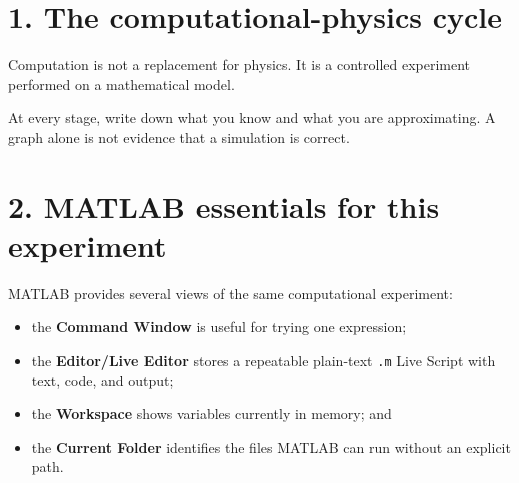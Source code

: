 \documentclass[11pt,a4paper]{article}
\begin{document}
\section*{1. The computational-physics cycle}
Computation is not a replacement for physics. It is a controlled experiment performed on a mathematical model.

\begin{center}
\end{center}

At every stage, write down what you know and what you are approximating. A graph alone is not evidence that a simulation is correct.

\section*{2. MATLAB essentials for this experiment}
MATLAB provides several views of the same computational experiment:
\begin{itemize}[nosep,leftmargin=5mm]
  \item the \textbf{Command Window} is useful for trying one expression;
  \item the \textbf{Editor/Live Editor} stores a repeatable plain-text \texttt{.m} Live Script with text, code, and output;
  \item the \textbf{Workspace} shows variables currently in memory; and
  \item the \textbf{Current Folder} identifies the files MATLAB can run without an explicit path.
\end{itemize}
\end{document}

